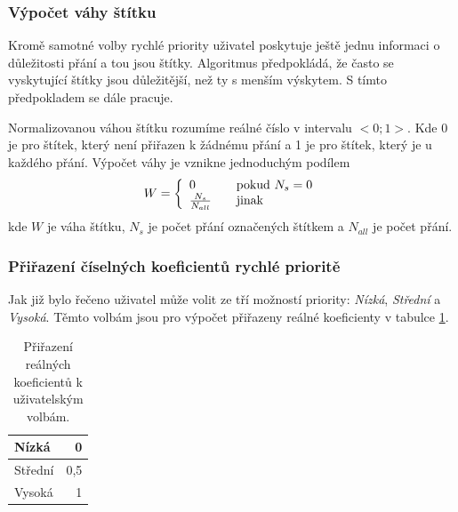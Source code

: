 \subsubsection{Výpočet váhy štítku}
Kromě samotné volby rychlé priority uživatel poskytuje ještě jednu informaci o důležitosti přání a tou jsou štítky. Algoritmus předpokládá, že často se vyskytující štítky jsou důležitější, než ty s menším výskytem. S tímto předpokladem se dále pracuje.

Normalizovanou váhou štítku rozumíme reálné číslo v intervalu $<0;1>$. Kde 0 je pro štítek, který není přiřazen k žádnému přání a 1 je pro štítek, který je u každého přání. Výpočet váhy je vznikne jednoduchým podílem
\begin{equation}
W = \left\{
  \begin{array}{l l}
    0 & \quad \text{pokud }N_s = 0\\
    \frac{N_s}{N_{all}} & \quad \text{jinak}
  \end{array} \right.
\label{eq:vaha-stitku}
\end{equation}
kde $W$ je váha štítku, $N_s$ je počet přání označených štítkem a $N_{all}$ je počet přání.

\subsubsection{Přiřazení číselných koeficientů rychlé prioritě}
Jak již bylo řečeno uživatel může volit ze tří možností priority: \emph{Nízká}, \emph{Střední} a \emph{Vysoká}. Těmto volbám jsou pro výpočet přiřazeny reálné koeficienty v tabulce \ref{tab:rychla-priorita}.

\begin{table}[htb]
\begin{center}
\begin{tabular}{|l|r|}
\hline
Nízká & 0\\ \hline
Střední & 0,5\\ \hline
Vysoká & 1 \\
\hline
\end{tabular}
\caption{Přiřazení reálných koeficientů k uživatelským volbám.}
\label{tab:rychla-priorita}
\end{center}
\end{table}

